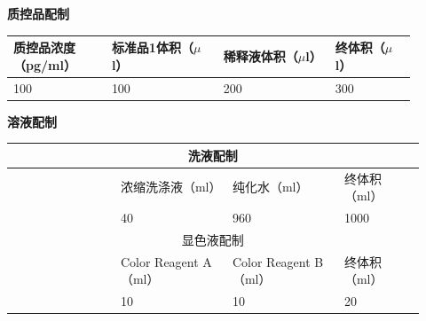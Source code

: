 \documentclass[UTF8,10pt,a4paper,fontset=fandol]{ctexart}
\newcommand{\fieldvalue}[1]{#1}
\newcommand{\handwritten}[1]{#1}
\begin{document}
\vspace{0.5em}

\begin{center}
\textbf{质控品配制}
\end{center}

\begin{tabular}{|p{0.22\linewidth}|p{0.25\linewidth}|p{0.25\linewidth}|p{0.18\linewidth}|}
\hline
质控品浓度（pg/ml） & 标准品1体积（$\mu$l） & 稀释液体积（$\mu$l） & 终体积（$\mu$l） \\
\hline
\fieldvalue{\handwritten{100}} &
\fieldvalue{\handwritten{100}} &
\fieldvalue{\handwritten{200}} &
\fieldvalue{\handwritten{300}} \\
\hline
\end{tabular}

\vspace{0.5em}

\begin{center}
\textbf{溶液配制}
\end{center}

\begin{tabular}{|p{0.24\linewidth}|p{0.25\linewidth}|p{0.25\linewidth}|p{0.18\linewidth}|}
\hline
\multicolumn{4}{|c|}{洗液配制} \\
\hline
 & 浓缩洗涤液（ml） & 纯化水（ml） & 终体积（ml） \\
\hline
 & 
\fieldvalue{\handwritten{40}} &
\fieldvalue{\handwritten{960}} &
\fieldvalue{\handwritten{1000}} \\
\hline
\multicolumn{4}{|c|}{显色液配制} \\
\hline
 & Color Reagent A（ml） & Color Reagent B（ml） & 终体积（ml） \\
\hline
 &
\fieldvalue{\handwritten{10}} &
\fieldvalue{\handwritten{10}} &
\fieldvalue{\handwritten{20}} \\
\hline
\end{tabular}
\end{document}
